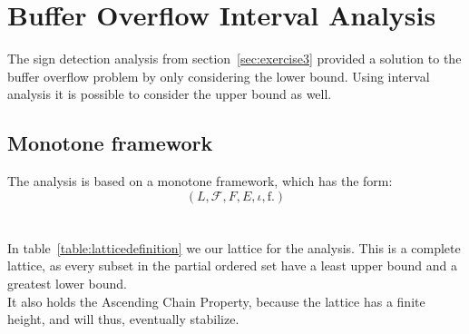 \section{Buffer Overflow Interval Analysis}
The sign detection analysis from section~\ref{sec:exercise3} provided a solution to the buffer overflow problem by only considering the lower bound. Using interval analysis it is possible to consider the upper bound as well.

\subsection{Monotone framework}
The analysis is based on a monotone framework, which has the form:
\begin{equation}
  \left(L, \mathcal{F}, F, E, \iota, \mathrm{f}.  \right)
  \label{eq:monotone_framework}
\end{equation}
\\\\
In table~\ref{table:latticedefinition} we our lattice for the analysis. This is a complete lattice, as every subset in the partial ordered set have a least upper bound and a greatest lower bound.\\
It also holds the Ascending Chain Property, because the lattice has a finite height, and will thus, eventually stabilize.
